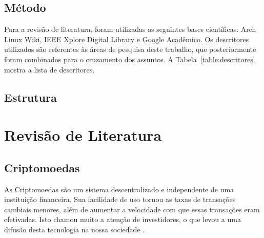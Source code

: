 \documentclass[
article,			%
12pt,				%
openright,			%
oneside,			%
a4paper,			%
chapter=TITLE,		%
section=TITLE,		%
subsection=TITLE,	%
subsubsection=TITLE,%
subsubsubsection=TITLE, %
english,			%
brazil,				%
]{abntex2}
\begin{document}
\subsection{Método}

Para a revisão de literatura, foram utilizadas as seguintes bases
científicas: Arch Linux Wiki, IEEE Xplore Digital Library e Google
Acadêmico. Os descritores utilizados são referentes às áreas de
pesquisa deste trabalho, que posteriormente foram combinados para o
cruzamento dos assuntos. A Tabela~\ref{table:descritores} mostra a
lista de descritores.

\begin{table}
    \centering
    \caption{\label{table:descritores}Descritores utilizados}
\end{table}

\subsection{Estrutura}

\section{Revisão de Literatura}

\subsection{Criptomoedas}

As Criptomoedas são um sistema descentralizado e independente de uma
instituição financeira. Sua facilidade de uso tornou as taxas de
transações cambiais menores, além de aumentar a velocidade com que
essas transações eram efetivadas. Isto chamou muito a atenção de
investidores, o que levou a uma difusão desta tecnologia na nossa
sociedade \cite{Nakamoto2008, Prado2017}.
\end{document}
